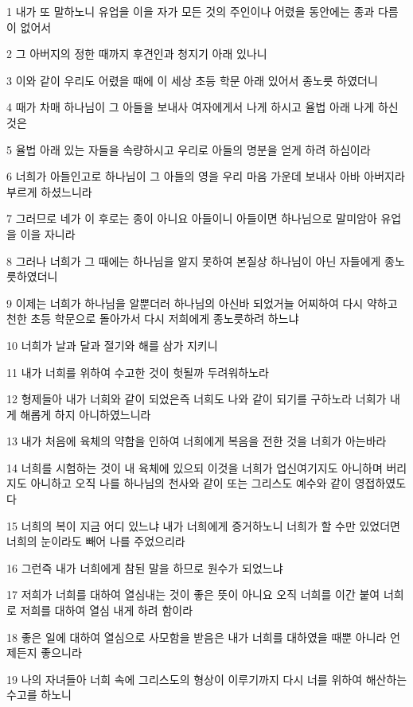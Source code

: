 \par 1 내가 또 말하노니 유업을 이을 자가 모든 것의 주인이나 어렸을 동안에는 종과 다름이 없어서
\par 2 그 아버지의 정한 때까지 후견인과 청지기 아래 있나니
\par 3 이와 같이 우리도 어렸을 때에 이 세상 초등 학문 아래 있어서 종노릇 하였더니
\par 4 때가 차매 하나님이 그 아들을 보내사 여자에게서 나게 하시고 율법 아래 나게 하신 것은
\par 5 율법 아래 있는 자들을 속량하시고 우리로 아들의 명분을 얻게 하려 하심이라
\par 6 너희가 아들인고로 하나님이 그 아들의 영을 우리 마음 가운데 보내사 아바 아버지라 부르게 하셨느니라
\par 7 그러므로 네가 이 후로는 종이 아니요 아들이니 아들이면 하나님으로 말미암아 유업을 이을 자니라
\par 8 그러나 너희가 그 때에는 하나님을 알지 못하여 본질상 하나님이 아닌 자들에게 종노릇하였더니
\par 9 이제는 너희가 하나님을 알뿐더러 하나님의 아신바 되었거늘 어찌하여 다시 약하고 천한 초등 학문으로 돌아가서 다시 저희에게 종노릇하려 하느냐
\par 10 너희가 날과 달과 절기와 해를 삼가 지키니
\par 11 내가 너희를 위하여 수고한 것이 헛될까 두려워하노라
\par 12 형제들아 내가 너희와 같이 되었은즉 너희도 나와 같이 되기를 구하노라 너희가 내게 해롭게 하지 아니하였느니라
\par 13 내가 처음에 육체의 약함을 인하여 너희에게 복음을 전한 것을 너희가 아는바라
\par 14 너희를 시험하는 것이 내 육체에 있으되 이것을 너희가 업신여기지도 아니하며 버리지도 아니하고 오직 나를 하나님의 천사와 같이 또는 그리스도 예수와 같이 영접하였도다
\par 15 너희의 복이 지금 어디 있느냐 내가 너희에게 증거하노니 너희가 할 수만 있었더면 너희의 눈이라도 빼어 나를 주었으리라
\par 16 그런즉 내가 너희에게 참된 말을 하므로 원수가 되었느냐
\par 17 저희가 너희를 대하여 열심내는 것이 좋은 뜻이 아니요 오직 너희를 이간 붙여 너희로 저희를 대하여 열심 내게 하려 함이라
\par 18 좋은 일에 대하여 열심으로 사모함을 받음은 내가 너희를 대하였을 때뿐 아니라 언제든지 좋으니라
\par 19 나의 자녀들아 너희 속에 그리스도의 형상이 이루기까지 다시 너를 위하여 해산하는 수고를 하노니
